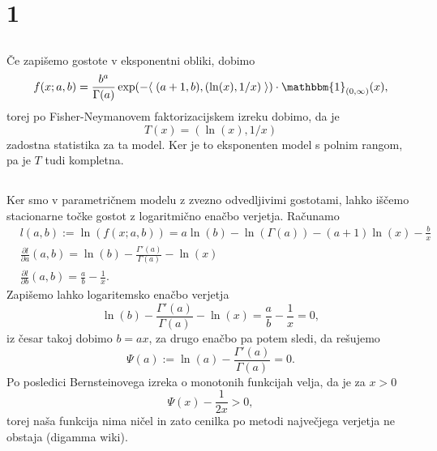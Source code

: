 \documentclass[ letterpaper, titlepage, fleqn]{article}
\newcommand{\scalar}[1]{\langle\;#1\;\rangle}
\newcommand{\ind}{\mathbbm{1}}
\begin{document}
\section{1}

\subsection{}
Če zapišemo gostote v eksponentni obliki, dobimo
$$f(x; a,b) = \frac{b^a}{\Gamma(a)} \exp(-\scalar{(a+1, b), (\ln(x), 1/x)}) \cdot \ind_{(0,\infty)}(x),$$
torej po Fisher-Neymanovem faktorizacijskem izreku dobimo, da je
$$T(x) = (\ln(x), 1/x)$$
zadostna statistika za ta model. Ker je to eksponenten model s polnim rangom, pa je $T$ tudi kompletna.

\subsection{}
Ker smo v parametričnem modelu z zvezno odvedljivimi gostotami, lahko iščemo stacionarne točke gostot 
z logaritmično enačbo verjetja. Računamo
\begin{equation*}
\begin{aligned}
&l(a,b) := \ln(f(x; a,b)) = a\ln(b) - \ln(\Gamma(a)) - (a+1)\ln(x) - \frac{b}{x} \\
&\frac{\partial l}{\partial a}(a,b) = \ln(b) - \frac{\Gamma'(a)}{\Gamma(a)} - \ln(x) \\
&\frac{\partial l}{\partial b}(a,b) = \frac{a}{b} - \frac{1}{x}.
\end{aligned}
\end{equation*}
Zapišemo lahko logaritemsko enačbo verjetja
$$\ln(b) - \frac{\Gamma'(a)}{\Gamma(a)} - \ln(x) = \frac{a}{b} - \frac{1}{x} = 0,$$
iz česar takoj dobimo $b = ax$, za drugo enačbo pa potem sledi, da rešujemo
$$\Psi(a) := \ln(a) - \frac{\Gamma'(a)}{\Gamma(a)} = 0.$$
Po posledici Bernsteinovega izreka o monotonih funkcijah velja, da je za $x > 0$
$$\Psi(x) - \frac{1}{2x} > 0,$$
torej naša funkcija nima ničel in zato cenilka po metodi največjega verjetja ne obstaja (digamma wiki).
\end{document}
